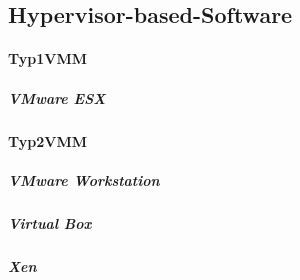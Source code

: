 \subsection{Hypervisor-based-Software}

\paragraph{Typ1VMM}
\subparagraph {VMware ESX}


\paragraph{Typ2VMM}
\subparagraph {VMware Workstation}
\subparagraph{Virtual Box}

\subparagraph {Xen}
